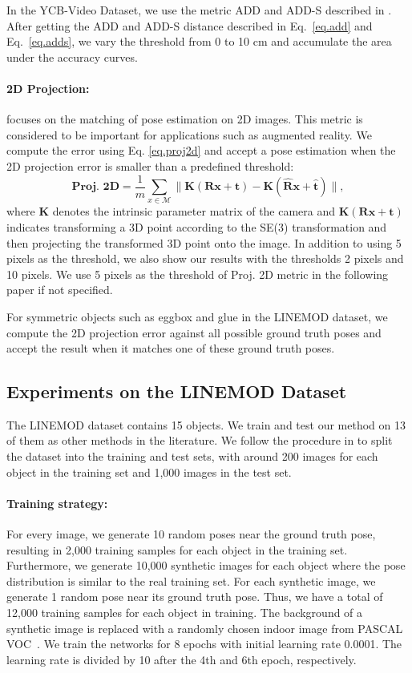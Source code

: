 \documentclass[twocolumn]{svjour3}
\begin{document}
In the YCB-Video Dataset, we use the metric ADD and ADD-S described in \cite{xiang2017posecnn}. After getting the ADD and ADD-S distance described in Eq.~\ref{eq.add} and Eq.~\ref{eq.adds}, we vary the threshold from 0 to 10 cm and accumulate the area under the accuracy curves.

\paragraph{2D Projection:} focuses on the matching of pose estimation on 2D images. This metric is considered to be important for applications such as augmented reality. We compute the error using Eq. \ref{eq.proj2d} and accept a pose estimation when the 2D projection error is smaller than a predefined threshold:
\begin{equation}
\label{eq.proj2d}
\textbf{Proj. 2D}=\frac{1}{m}\sum_{x\in \mathcal{M}}\|\mathbf{K}(\mathbf{R}\mathbf{x}+\mathbf{t}) - \mathbf{K}(\mathbf{\hat{R}}\mathbf{x}+\mathbf{\hat{t}})\|,
\end{equation}
where $\mathbf{K}$ denotes the intrinsic parameter matrix of the camera and $\mathbf{K}(\mathbf{R}\mathbf{x}+\mathbf{t})$ indicates transforming a 3D point according to the SE(3) transformation and then projecting the transformed 3D point onto the image. In addition to using 5 pixels as the threshold, we also show our results with the thresholds 2 pixels and 10 pixels. We use 5 pixels as the threshold of Proj. 2D metric in the following paper if not specified.


For symmetric objects such as eggbox and glue in the LINEMOD dataset, we compute the 2D projection error against all possible ground truth poses and accept the result when it matches one of these ground truth poses.

\subsection{Experiments on the LINEMOD Dataset}
\label{sec.exp_on_LM}
The LINEMOD dataset contains 15 objects. We train and test our method on 13 of them as other methods in the literature. We follow the procedure in \citep{brachmann2016uncertainty} to split the dataset into the training and test sets, with around 200 images for each object in the training set and 1,000 images in the test set.

\paragraph{Training strategy:}%
For every image, we generate 10 random poses near the ground truth pose, resulting in 2,000 training samples for each object in the training set. Furthermore, we generate 10,000 synthetic images for each object where the pose distribution is similar to the real training set. For each synthetic image, we generate 1 random pose near its ground truth pose. Thus, we have a total of 12,000 training samples for each object in training. The background of a synthetic image is replaced with a randomly chosen indoor image from PASCAL VOC~\citep{everingham2010pascal}. We train the networks for 8 epochs with initial learning rate 0.0001. The learning rate is divided by 10 after the 4th and 6th epoch, respectively.
\end{document}
